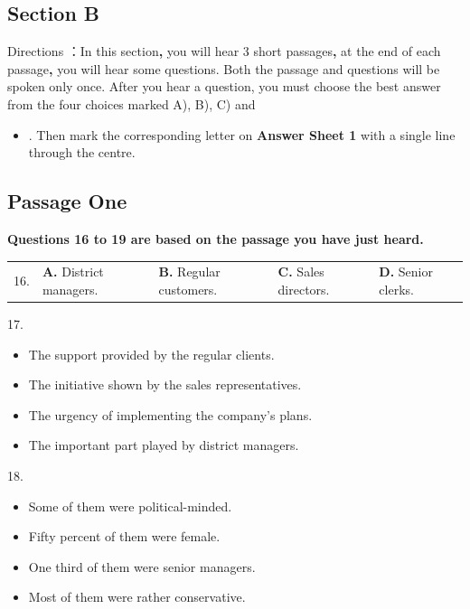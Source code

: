 \documentclass[UTF8,11pt]{ctexart}
\begin{document}
\subsection*{\textbf{Section B}}


Directions ：In this section\textbf{,} you will hear 3 short passages\textbf{,} at the end of each passage\textbf{,} you will hear some questions. Both the passage and questions will be spoken only once. After you hear a question, you must choose the best answer from the four choices marked A), B), C) and


\begin{itemize}[leftmargin=2em,itemsep=.2em,topsep=.4em]\item[D.] . Then mark the corresponding letter on \textbf{Answer Sheet 1} with a single line through the centre.
\end{itemize}

\subsection*{\textbf{Passage One}}


\textbf{Questions 16 to 19 are based on the passage you have just heard.}


\noindent\begin{tabularx}{\linewidth}{@{}lXXXX@{}}16. & \textbf{A.} District managers. & \textbf{B.} Regular customers. & \textbf{C.} Sales directors. & \textbf{D.} Senior clerks.\\\end{tabularx}\par

17.


\begin{itemize}[leftmargin=2em,itemsep=.2em,topsep=.4em]\item[A.] The support provided by the regular clients.
\item[B.] The initiative shown by the sales representatives.
\item[C.] The urgency of implementing the company’s plans.
\item[D.] The important part played by district managers.
\end{itemize}

18.


\begin{itemize}[leftmargin=2em,itemsep=.2em,topsep=.4em]\item[A.] Some of them were political-minded.
\item[B.] Fifty percent of them were female.
\item[C.] One third of them were senior managers.
\item[D.] Most of them were rather conservative.
\end{itemize}
\end{document}

